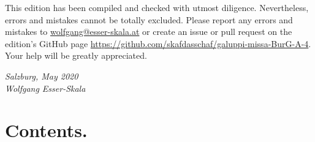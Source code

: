 \documentclass[parskip=full]{scrreprt}
\newif\iftemplate\templatetrue
\begin{document}
This edition has been compiled and checked with utmost diligence. Nevertheless, errors and mistakes cannot be totally excluded. Please report any errors and mistakes to \url{wolfgang@esser-skala.at} or create an issue or pull request on the edition’s GitHub page \url{https://github.com/skafdasschaf/galuppi-missa-BurG-A-4}. Your help will be greatly appreciated.

\bigskip
\textit{Salzburg, May 2020\\
Wolfgang Esser-Skala}

\cleardoublepage
\chapter*{Contents.}


\cleardoublepage
\fi

\iftemplate

\fi
\end{document}
